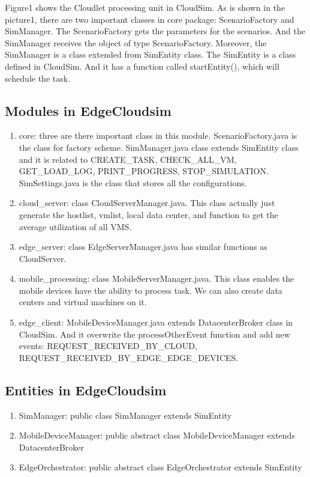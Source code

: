 Figure1 shows the Cloudlet processing unit in CloudSim. As is shown in the picture1, there are two important classes in core package: ScenarioFactory and SimManager. The ScenarioFactory gets the parameters for the scenarios. And the SimManager receives the object of type ScenarioFactory. Moreover, the SimManager is a class extended from SimEntity class. The SimEntity is a class defined in CloudSim. And it has a function called startEntity(), which will schedule the task. 


\subsection{Modules in EdgeCloudsim}
\begin{enumerate}
	\item core: three are there important class in this module. ScenarioFactory.java is the class for factory scheme. SimManager.java class extends SimEntity class and it is related to CREATE\_TASK, CHECK\_ALL\_VM, GET\_LOAD\_LOG, PRINT\_PROGRESS, STOP\_SIMULATION. SimSettings.java is the class that stores all the configurations.
	\item cloud\_server: class CloudServerManager.java. This class actually just generate the hostlist, vmlist, local data center, and function to get the average utilization of all VMS. 
	\item edge\_server: class EdgeServerManager.java has similar functions as CloudServer.
	\item mobile\_processing: class MobileServerManager.java. This class enables the mobile devices have the ability to process task. We can also create data centers and virtual machines on it.
	\item edge\_client: MobileDeviceManager.java extends DatacenterBroker class in CloudSim. And it overwrite the processOtherEvent function and add new events: REQUEST\_RECEIVED\_BY\_CLOUD, REQUEST\_RECEIVED\_BY\_EDGE\_EDGE\_DEVICES.
\end{enumerate}


\subsection{Entities in EdgeCloudsim}
\begin{enumerate}
	\item SimManager: public class SimManager extends SimEntity
	\item MobileDeviceManager: public abstract class MobileDeviceManager  extends DatacenterBroker
	\item EdgeOrchestrator: public abstract class EdgeOrchestrator extends SimEntity
\end{enumerate}


